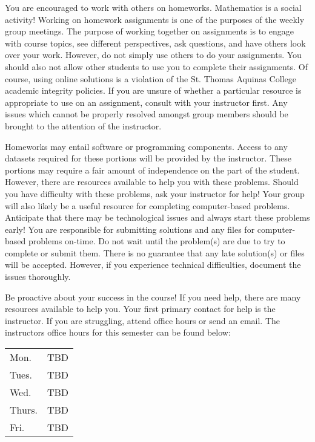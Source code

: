 \documentclass[11pt,letterpaper]{article}
\begin{document}
You are encouraged to work with others on homeworks. Mathematics is a social activity! Working on homework assignments is one of the purposes of the weekly group meetings. The purpose of working together on assignments is to engage with course topics, see different perspectives, ask questions, and have others look over your work. However, do not simply use others to do your assignments. You should also not allow other students to use you to complete their assignments. Of course, using online solutions is a violation of the St. Thomas Aquinas College academic integrity policies. If you are unsure of whether a particular resource is appropriate to use on an assignment, consult with your instructor first. Any issues which cannot be properly resolved amongst group members should be brought to the attention of the instructor. \pspace

Homeworks may entail software or programming components. Access to any datasets required for these portions will be provided by the instructor. These portions may require a fair amount of independence on the part of the student. However, there are resources available to help you with these problems. Should you have difficulty with these problems, ask your instructor for help! Your group will also likely be a useful resource for completing computer-based problems. Anticipate that there may be technological issues and always start these problems early! You are responsible for submitting solutions and any files for computer-based problems on-time. Do not wait until the problem(s) are due to try to complete or submit them. There is no guarantee that any late solution(s) or files will be accepted. However, if you experience technical difficulties, document the issues thoroughly. 
\sectionbreak



Be proactive about your success in the course! If you need help, there are many resources available to help you. Your first primary contact for help is the instructor. If you are struggling, attend office hours or send an email. The instructors office hours for this semester can be found below: \par

	\begin{table}[!ht]
	\centering
	\begin{tabular}{l || l}
	Mon. & TBD \\
	Tues. & TBD \\
	Wed. & TBD \\
	Thurs. & TBD \\
	Fri. & TBD 
	\end{tabular}
	\end{table} \par
\end{document}
